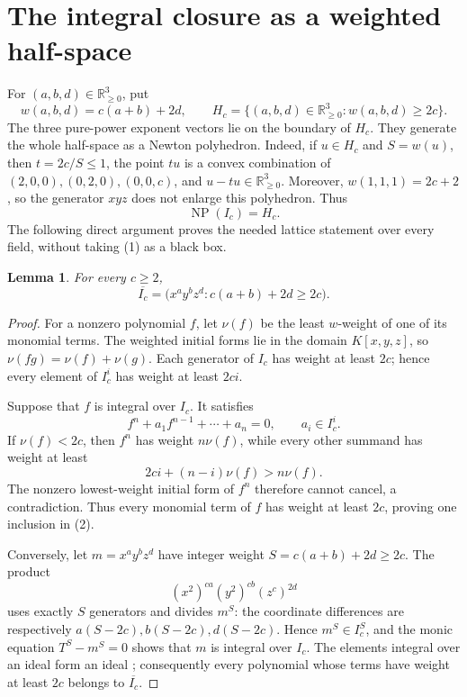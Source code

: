 \documentclass[11pt]{article}
\newtheorem{lemma}[theorem]{Lemma}
\newcommand{\NP}{\operatorname{NP}}
\begin{document}
\section{The integral closure as a weighted half-space}

For \((a,b,d)\in\mathbb R_{\geq0}^3\), put
\[
 w(a,b,d)=c(a+b)+2d,
 \qquad
 H_c=\{(a,b,d)\in\mathbb R_{\geq0}^3:w(a,b,d)\geq2c\}.
\]
The three pure-power exponent vectors lie on the boundary of \(H_c\).
They generate the whole half-space as a Newton polyhedron.  Indeed, if
\(u\in H_c\) and \(S=w(u)\), then \(t=2c/S\leq1\), the point \(tu\) is a
convex combination of \((2,0,0),(0,2,0),(0,0,c)\), and
\(u-tu\in\mathbb R_{\geq0}^3\).  Moreover,
\(w(1,1,1)=2c+2\), so the generator \(xyz\) does not enlarge this
polyhedron.  Thus
\[
 \NP(I_c)=H_c.\tag{1}
\]
The following direct argument proves the needed lattice statement over
every field, without taking (1) as a black box.

\begin{lemma}\label{lem:closure}
For every \(c\geq2\),
\[
 \overline{I_c}
 =\bigl(x^ay^bz^d:c(a+b)+2d\geq2c\bigr).\tag{2}
\]
\end{lemma}

\begin{proof}
For a nonzero polynomial \(f\), let \(\nu(f)\) be the least \(w\)-weight
of one of its monomial terms.  The weighted initial forms lie in the domain
\(K[x,y,z]\), so
\(\nu(fg)=\nu(f)+\nu(g)\).  Each generator of \(I_c\) has weight at least
\(2c\); hence every element of \(I_c^i\) has weight at least \(2ci\).

Suppose that \(f\) is integral over \(I_c\).  It satisfies
\[
 f^n+a_1f^{n-1}+\cdots+a_n=0,
 \qquad a_i\in I_c^i.
\]
If \(\nu(f)<2c\), then \(f^n\) has weight \(n\nu(f)\), while every other
summand has weight at least
\[
 2ci+(n-i)\nu(f)>n\nu(f).
\]
The nonzero lowest-weight initial form of \(f^n\) therefore cannot cancel,
a contradiction.  Thus every monomial term of \(f\) has weight at least
\(2c\), proving one inclusion in (2).

Conversely, let \(m=x^ay^bz^d\) have integer weight
\(S=c(a+b)+2d\geq2c\).  The product
\[
 (x^2)^{ca}(y^2)^{cb}(z^c)^{2d}
\]
uses exactly \(S\) generators and divides \(m^S\): the coordinate
differences are respectively
\(a(S-2c),b(S-2c),d(S-2c)\).  Hence \(m^S\in I_c^S\), and the monic
equation \(T^S-m^S=0\) shows that \(m\) is integral over \(I_c\).
The elements integral over an ideal form an ideal
\cite[Chapter~1]{HunekeSwanson2006}; consequently every polynomial whose
terms have weight at least \(2c\) belongs to \(\overline{I_c}\).
\end{proof}
\end{document}

